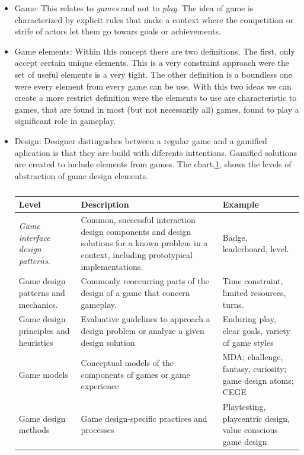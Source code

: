 \begin{itemize}

\item Game: This relates to \emph{games} and not to \emph{play}. The idea of game is
characterized by explicit rules that make a context where the competition or strife
of actors let them go towars goals or achievements.    

\item Game elements: Within this concept there are two definitions. The first,
only accept certain unique elements. This is a very constraint approach were the set
of useful elements is a very tight. The other definition is a boundless one were every
element from every game can be use. With this two ideas we can create a more restrict 
definition were the elements to use are characteristic to games, that are
found in most (but not necessarily all) games, found to play a significant role in gameplay. 

\item Design: Designer distingushes between a regular game and a gamified aplication 
is that they are build with diferents inttentions. Gamified solutions are created to 
include elements from games. The chart,\ref{Chart:Levels}, shows the levels of 
abstraction of game design elements.

\begin{table}[h]
  \footnotesize
  \begin{center}
    \begin{tabular}{ | p{5cm} | p{5cm} | p{5cm} |}
    \hline
    Level & Description &  Example \\ \hline
    \emph{Game interface design patterns}. & 
    Common, successful interaction
    design components and design
    solutions for a known problem in
    a context, including prototypical
    implementations. &
    Badge, leaderboard, level. \\ \hline
    Game design patterns and
    mechanics. & 
    Commonly reoccurring parts of
    the design of a game that concern
    gameplay. &
    Time constraint,
    limited resources,
    turns. \\ \hline
    Game design principles and
    heuristics &
    Evaluative guidelines to approach
    a design problem or
    analyze a given design solution &
    Enduring play, clear goals, variety of
    game styles \\ \hline
    Game models &
    Conceptual models of the
    components of games or game
    experience &
    MDA; challenge,
    fantasy, curiosity;
    game design atoms;
    CEGE \\ \hline
    Game design methods &
    Game design-specific practices
    and processes &
    Playtesting, playcentric design,
    value conscious game design \\ \hline
    \end{tabular}
    \caption[]{\cite{DefineGamefication}}
    \label{Chart:Levels}
  \end{center}
\end{table}


\end{itemize}
